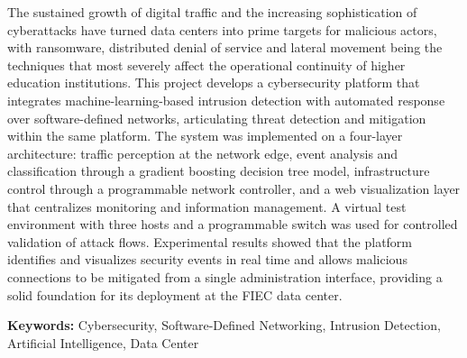 The sustained growth of digital traffic and the increasing sophistication of cyberattacks have turned data centers into prime targets for malicious actors, with ransomware, distributed denial of service and lateral movement being the techniques that most severely affect the operational continuity of higher education institutions. This project develops a cybersecurity platform that integrates machine-learning-based intrusion detection with automated response over software-defined networks, articulating threat detection and mitigation within the same platform. The system was implemented on a four-layer architecture: traffic perception at the network edge, event analysis and classification through a gradient boosting decision tree model, infrastructure control through a programmable network controller, and a web visualization layer that centralizes monitoring and information management. A virtual test environment with three hosts and a programmable switch was used for controlled validation of attack flows. Experimental results showed that the platform identifies and visualizes security events in real time and allows malicious connections to be mitigated from a single administration interface, providing a solid foundation for its deployment at the FIEC data center.

\textbf{Keywords:} Cybersecurity, Software-Defined Networking, Intrusion Detection, Artificial Intelligence, Data Center